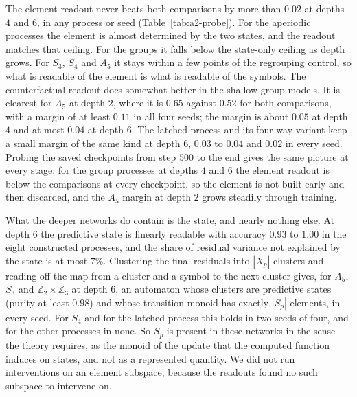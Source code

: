 \documentclass[10pt]{article}
\theoremstyle{definition}
\theoremstyle{remark}
\begin{document}
The element readout never beats both comparisons by more than
$0.02$ at depths $4$ and $6$, in any process or seed
(Table~\ref{tab:a2-probe}).  For the aperiodic processes the element
is almost determined by the two states, and the readout matches that
ceiling.  For the groups it falls below the state-only ceiling as
depth grows.  For $S_3$, $S_4$ and $A_5$ it stays within a few points
of the regrouping control, so what is readable of the element is
what is readable of the symbols.  The counterfactual readout does
somewhat better in the shallow group models.  It is clearest for
$A_5$ at depth $2$, where it is $0.65$ against $0.52$ for both
comparisons, with a margin of at least $0.11$ in all four seeds; the
margin is about $0.05$ at depth $4$ and at most $0.04$ at depth $6$.
The latched process and its four-way variant keep a small margin of
the same kind at depth $6$, $0.03$ to $0.04$ and $0.02$ in every
seed.
Probing the saved checkpoints from step $500$ to the end gives the
same picture at every stage: for the group processes at depths $4$
and $6$ the element readout is below the comparisons at every
checkpoint, so the element is not built early and then discarded,
and the $A_5$ margin at depth $2$ grows steadily through training.

What the deeper networks do contain is the state, and nearly nothing
else.  At depth $6$ the predictive state is linearly readable with
accuracy $0.93$ to $1.00$ in the eight constructed processes, and
the share of residual variance not explained by the state is at most
$7\%$.  Clustering the final residuals into $|X_p|$
clusters and reading off the map from a cluster and a symbol to the
next cluster gives, for $A_5$, $S_3$ and
$\mathbb Z_2\times\mathbb Z_3$ at depth $6$, an automaton whose
clusters are predictive states (purity at least $0.98$) and whose
transition monoid has exactly $|S_p|$ elements, in every seed.  For
$S_4$ and for the latched process this holds in two seeds of four,
and for the other processes in none.  So
$S_p$ is present in these networks in the sense the theory requires,
as the monoid of the update that the computed function induces on
states, and not as a represented quantity.  We did not run
interventions on an element subspace, because the readouts found no
such subspace to intervene on.
\end{document}
